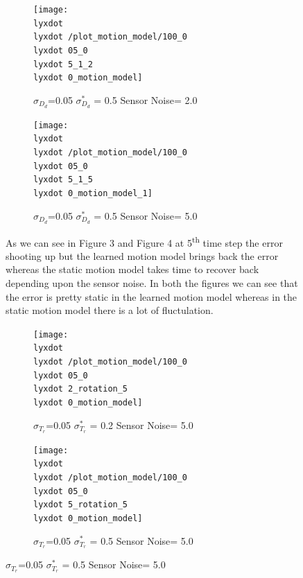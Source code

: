 \documentclass[12pt,draft]{dalcsthesis}
\begin{document}
{{\begin{figure}
{\begin{figure}
\caption{$\sigma_{D_{d}}$=0.05 $\sigma_{D_{d}}^{*}$ = 0.5 Sensor Noise= 2.0}


\texttt{[image: \\lyxdot \\lyxdot /plot\_motion\_model/100\_0\\lyxdot 05\_0\\lyxdot 5\_1\_2\\lyxdot 0\_motion\_model]}

\end{figure}


\begin{figure}
\caption{$\sigma_{D_{d}}$=0.05 $\sigma_{D_{d}}^{*}$ = 0.5 Sensor Noise= 5.0}


\texttt{[image: \\lyxdot \\lyxdot /plot\_motion\_model/100\_0\\lyxdot 05\_0\\lyxdot 5\_1\_5\\lyxdot 0\_motion\_model\_1]}

\end{figure}


As we can see in Figure 3 and Figure 4 at 5\textsuperscript{th} time
step the error shooting up but the learned motion model brings back
the error whereas the static motion model takes time to recover back
depending upon the sensor noise. In both the figures we can see that
the error is pretty static in the learned motion model whereas in
the static motion model there is a lot of fluctulation. 

\begin{figure}
\caption{$\sigma_{T_{r}}$=0.05 $\sigma_{T_{r}}^{*}$ = 0.2 Sensor Noise= 5.0}


\texttt{[image: \\lyxdot \\lyxdot /plot\_motion\_model/100\_0\\lyxdot 05\_0\\lyxdot 2\_rotation\_5\\lyxdot 0\_motion\_model]}

\end{figure}


\begin{figure}
\caption{$\sigma_{T_{r}}$=0.05 $\sigma_{T_{r}}^{*}$ = 0.5 Sensor Noise= 5.0}


\texttt{[image: \\lyxdot \\lyxdot /plot\_motion\_model/100\_0\\lyxdot 05\_0\\lyxdot 5\_rotation\_5\\lyxdot 0\_motion\_model]}


\end{figure}}
\end{figure}}}
\end{document}

